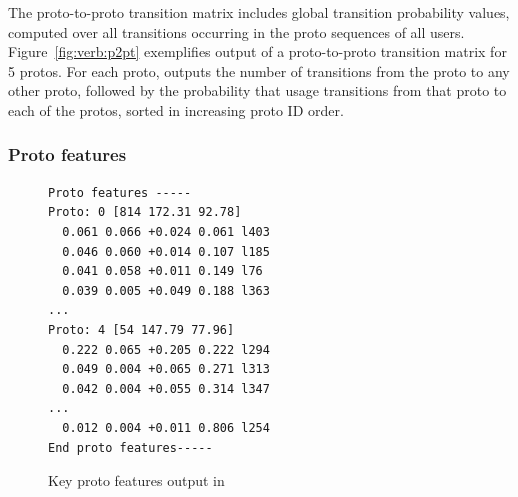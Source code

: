 \documentclass[]{article}
\begin{document}
The proto-to-proto transition matrix includes global transition probability
values, computed over all transitions occurring in the proto sequences of all
users. Figure~\ref{fig:verb:p2pt} exemplifies output of a proto-to-proto
transition matrix for 5 protos. For each proto, \orionp outputs the number of
transitions from the proto to any other proto, followed by the probability
that usage transitions from that proto to each of the protos, sorted in
increasing proto ID order.

\vspace{10pt}

\subsubsection{Proto features}
\label{sec:usage:orion:ftrs}

\begin{figure}[h] 
\small
\begin{Verbatim}[frame=single]
Proto features -----
Proto: 0 [814 172.31 92.78]
  0.061 0.066 +0.024 0.061 l403
  0.046 0.060 +0.014 0.107 l185
  0.041 0.058 +0.011 0.149 l76
  0.039 0.005 +0.049 0.188 l363
...
Proto: 4 [54 147.79 77.96]
  0.222 0.065 +0.205 0.222 l294
  0.049 0.004 +0.065 0.271 l313
  0.042 0.004 +0.055 0.314 l347
...
  0.012 0.004 +0.011 0.806 l254
End proto features-----
\end{Verbatim}
\caption{Key proto features output in \orionp}
\label{fig:verb:ftrs}
\end{figure}
\end{document}
